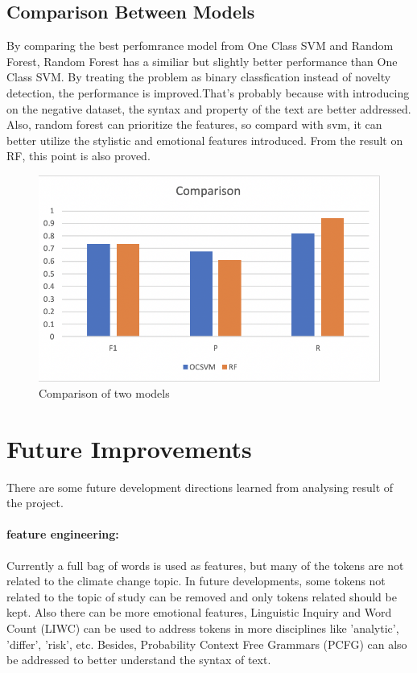 \documentclass[11pt,a4paper]{article}
\begin{document}
\subsection{Comparison Between Models}
By comparing the best perfomrance model from One Class SVM and Random Forest, Random Forest has a similiar but slightly better performance than One Class SVM. By treating the problem as binary classfication instead of novelty detection, the performance is improved.That's probably because with introducing on the negative dataset, the syntax and property of the text are better addressed. Also, random forest can prioritize the features, so compard with svm, it can better utilize the stylistic and emotional features introduced. From the result on RF, this point is also proved.

\begin{figure}[h!]
  \includegraphics[width=\linewidth]{compare.png}
  \caption{Comparison of two models}
  \label{fig:figure1}
\end{figure}

\section{Future Improvements}
There are some future development directions learned from analysing result of the project.
\paragraph{feature engineering:}
Currently a full bag of words is used as features, but many of the tokens are not related to the climate change topic. In future developments, some tokens not related to the topic of study can be removed and only tokens related should be kept. Also there can be more emotional features, Linguistic Inquiry and Word Count (LIWC) can be used to address tokens in more disciplines like 'analytic', 'differ', 'risk', etc. Besides, Probability Context Free Grammars (PCFG) can also be addressed to better understand the syntax of text.
\end{document}
